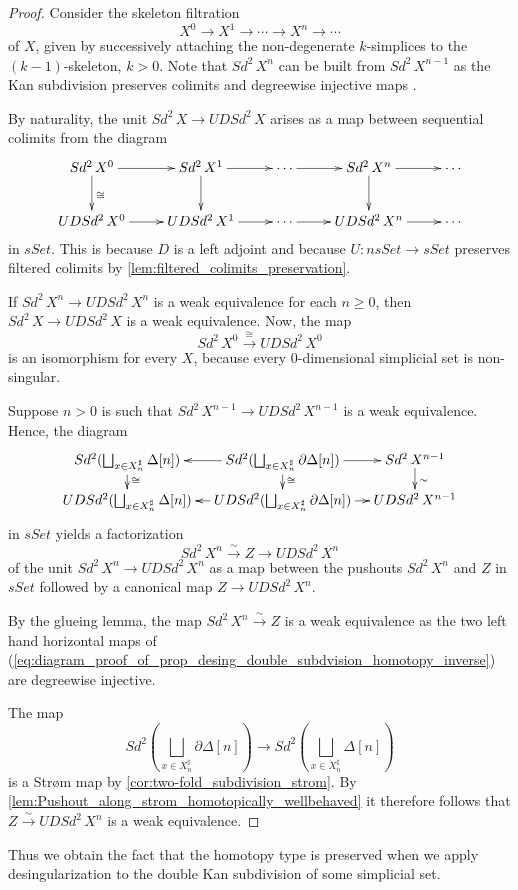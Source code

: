 \begin{proof}
Consider the skeleton filtration
\[X^0\to X^1\to \cdots \to X^n\to \cdots \]
of $X$, given by successively attaching the non-degenerate $k$-simplices to the $(k-1)$-skeleton, $k>0$. Note that $Sd^2\, X^n$ can be built from $Sd^2\, X^{n-1}$ as the Kan subdivision preserves colimits and degreewise injective maps \cite[Prop.~4.6.3~(i),~p.~200]{FP90}.

By naturality, the unit $Sd^2\, X\to UDSd^2\, X$ arises as a map between sequential colimits from the diagram
\begin{displaymath}
\xymatrix{
Sd^2\, X^0 \ar[d]^\cong \ar[r] & Sd^2\, X^1 \ar[d] \ar[r] & \cdots \ar[r] & Sd^2\, X^n \ar[d] \ar[r] & \cdots \\
UDSd^2\, X^0 \ar[r] & UDSd^2\, X^1 \ar[r] & \cdots \ar[r] & UDSd^2\, X^n \ar[r] & \cdots
}
\end{displaymath}
in $sSet$. This is because $D$ is a left adjoint and because $U:nsSet\to sSet$ preserves filtered colimits by \cref{lem:filtered_colimits_preservation}.

If $Sd^2\, X^n\to UDSd^2\, X^n$ is a weak equivalence for each $n\geq 0$, then $Sd^2\, X\to UDSd^2\, X$ is a weak equivalence. Now, the map
\[Sd^2\, X^0\xrightarrow{\cong} UDSd^2\, X^0\]
is an isomorphism for every $X$, because every $0$-dimensional simplicial set is non-singular.

Suppose $n>0$ is such that $Sd^2\, X^{n-1}\to UDSd^2\, X^{n-1}$ is a weak equivalence.  Hence, the diagram
\begin{equation}
\label{eq:diagram_proof_of_prop_desing_double_subdvision_homotopy_inverse}
\begin{gathered}
\xymatrix@=1em{
Sd^2(\bigsqcup _{x\in X^\sharp _n}\Delta [n]) \ar[d]^\cong & Sd^2(\bigsqcup _{x\in X^\sharp _n}\partial \Delta [n]) \ar[l] \ar[d]^\cong \ar[r] & Sd^2\, X^{n-1} \ar[d]^\sim \\
UDSd^2(\bigsqcup _{x\in X^\sharp _n}\Delta [n]) & UDSd^2(\bigsqcup _{x\in X^\sharp _n}\partial \Delta [n]) \ar[l] \ar[r] & UDSd^2\, X^{n-1}
}
\end{gathered}
\end{equation}
in $sSet$ yields a factorization
\[Sd^2\, X^n\xrightarrow{\sim } Z\to UDSd^2\, X^n\]
of the unit $Sd^2\, X^n\to UDSd^2\, X^n$ as a map between the pushouts $Sd^2\, X^n$ and $Z$ in $sSet$ followed by a canonical map $Z\to UDSd^2\, X^n$.

By the glueing lemma, the map $Sd^2\, X^n\xrightarrow{\sim } Z$ is a weak equivalence as the two left hand horizontal maps of (\ref{eq:diagram_proof_of_prop_desing_double_subdvision_homotopy_inverse}) are degreewise injective.

The map
\[Sd^2(\bigsqcup _{x\in X^\sharp _n}\partial \Delta [n])\to Sd^2(\bigsqcup _{x\in X^\sharp _n}\Delta [n])\]
is a Str\o m map by \cref{cor:two-fold_subdivision_strom}. By \cref{lem:Pushout_along_strom_homotopically_wellbehaved} it therefore follows that $Z\xrightarrow{\sim } UDSd^2\, X^n$ is a weak equivalence.
\end{proof}
\noindent Thus we obtain the fact that the homotopy type is preserved when we apply desingularization to the double Kan subdivision of some simplicial set.

